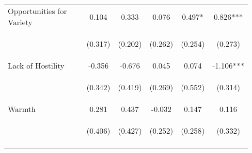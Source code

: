 \begin{tabular}{lccccc}
\noalign{\smallskip}Opportunities for Variety & 0.104 & 0.333 & 0.076 & 0.497* & 0.826***\\
 & \begin{footnotesize}(0.317)\end{footnotesize} & \begin{footnotesize}(0.202)\end{footnotesize} & \begin{footnotesize}(0.262)\end{footnotesize} & \begin{footnotesize}(0.254)\end{footnotesize} & \begin{footnotesize}(0.273)\end{footnotesize}\\
\noalign{\smallskip}Lack of Hostility & -0.356 & -0.676 & 0.045 & 0.074 & -1.106***\\
 & \begin{footnotesize}(0.342)\end{footnotesize} & \begin{footnotesize}(0.419)\end{footnotesize} & \begin{footnotesize}(0.269)\end{footnotesize} & \begin{footnotesize}(0.552)\end{footnotesize} & \begin{footnotesize}(0.314)\end{footnotesize}\\
\noalign{\smallskip}Warmth & 0.281 & 0.437 & -0.032 & 0.147 & 0.116\\
 & \begin{footnotesize}(0.406)\end{footnotesize} & \begin{footnotesize}(0.427)\end{footnotesize} & \begin{footnotesize}(0.252)\end{footnotesize} & \begin{footnotesize}(0.258)\end{footnotesize} & \begin{footnotesize}(0.332)\end{footnotesize}\\
\noalign{\smallskip}\hline\end{tabular}\\
